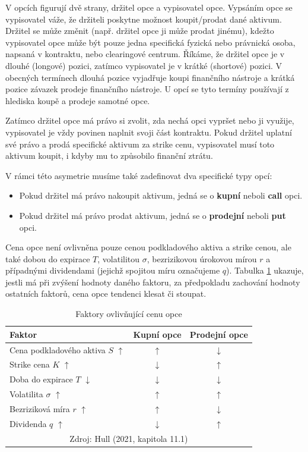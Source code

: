 \documentclass[male,czech,api_bc]{kitheses}
\begin{document}
  V opcích figurují dvě strany, držitel opce a vypisovatel opce. Vypsáním opce se vypisovatel váže, že držiteli poskytne možnost koupit/prodat dané aktivum. Držitel se může změnit (např. držitel opce ji může prodat jinému), kdežto vypisovatel opce může být pouze jedna specifická fyzická nebo právnická osoba, napsaná v kontraktu, nebo clearingové centrum. Říkáme, že držitel opce je v dlouhé (longové) pozici, zatímco vypisovatel je v krátké (shortové) pozici. V obecných termínech dlouhá pozice vyjadřuje koupi finančního nástroje a krátká pozice závazek prodeje finančního nástroje. U opcí se tyto termíny používají z hlediska koupě a prodeje samotné opce. 

  Zatímco držitel opce má právo si zvolit, zda nechá opci vypršet nebo ji využije, vypisovatel je vždy povinen naplnit svoji část kontraktu. Pokud držitel uplatní své právo a prodá specifické aktivum za strike cenu, vypisovatel musí toto aktivum koupit, i kdyby mu to způsobilo finanční ztrátu.

  V rámci této asymetrie musíme také zadefinovat dva specifické typy opcí:
  \begin{itemize}
    \item Pokud držitel má právo nakoupit aktivum, jedná se o \textbf{kupní} neboli \textbf{call} opci.
    \item Pokud držitel má právo prodat aktivum, jedná se o \textbf{prodejní} neboli \textbf{put} opci.
  \end{itemize}

  Cena opce není ovlivněna pouze cenou podkladového aktiva a strike cenou, ale také dobou do expirace $T$, volatilitou $\sigma$, bezrizikovou úrokovou mírou $r$ a případnými dividendami (jejichž spojitou míru označujeme $q$). Tabulka \ref{tab:price_modifiers} ukazuje, jestli má při zvýšení hodnoty daného faktoru, za předpokladu zachování hodnoty ostatních faktorů, cena opce tendenci klesat či stoupat. 

  \begin{table}[h]
    \caption{Faktory ovlivňující cenu opce}
    \label{tab:price_modifiers}
    \centering
    \begin{tabular}{lcc}
      \toprule
      \textbf{Faktor} & \textbf{Kupní opce} & \textbf{Prodejní opce} \\
      \midrule
      Cena podkladového aktiva $S$ $\uparrow$ & $\uparrow$ & $\downarrow$ \\
      Strike cena $K$ $\uparrow$ & $\downarrow$ & $\uparrow$ \\
      Doba do expirace $T$ $\downarrow$ & $\downarrow$ & $\downarrow$ \\
      Volatilita $\sigma$ $\uparrow$ & $\uparrow$ & $\uparrow$ \\
      Bezriziková míra $r$ $\uparrow$ & $\uparrow$ & $\downarrow$ \\
      Dividenda $q$ $\uparrow$ & $\downarrow$ & $\uparrow$ \\
      \bottomrule
      \multicolumn{3}{c}{Zdroj: Hull (2021, kapitola 11.1)}
    \end{tabular}
  \end{table}
\end{document}
